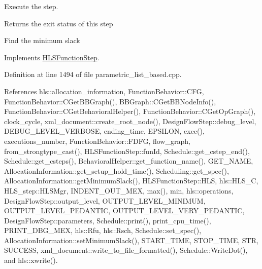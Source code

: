 Execute the step. 

\begin{DoxyReturn}{Returns}
the exit status of this step 
\end{DoxyReturn}
Find the minimum slack 

Implements \hyperlink{classHLSFunctionStep_a8db4c00d080655984d98143206fc9fa8}{H\+L\+S\+Function\+Step}.



Definition at line 1494 of file parametric\+\_\+list\+\_\+based.\+cpp.



References hls\+::allocation\+\_\+information, Function\+Behavior\+::\+C\+FG, Function\+Behavior\+::\+C\+Get\+B\+B\+Graph(), B\+B\+Graph\+::\+C\+Get\+B\+B\+Node\+Info(), Function\+Behavior\+::\+C\+Get\+Behavioral\+Helper(), Function\+Behavior\+::\+C\+Get\+Op\+Graph(), clock\+\_\+cycle, xml\+\_\+document\+::create\+\_\+root\+\_\+node(), Design\+Flow\+Step\+::debug\+\_\+level, D\+E\+B\+U\+G\+\_\+\+L\+E\+V\+E\+L\+\_\+\+V\+E\+R\+B\+O\+SE, ending\+\_\+time, E\+P\+S\+I\+L\+ON, exec(), executions\+\_\+number, Function\+Behavior\+::\+F\+D\+FG, flow\+\_\+graph, from\+\_\+strongtype\+\_\+cast(), H\+L\+S\+Function\+Step\+::fun\+Id, Schedule\+::get\+\_\+cstep\+\_\+end(), Schedule\+::get\+\_\+csteps(), Behavioral\+Helper\+::get\+\_\+function\+\_\+name(), G\+E\+T\+\_\+\+N\+A\+ME, Allocation\+Information\+::get\+\_\+setup\+\_\+hold\+\_\+time(), Scheduling\+::get\+\_\+spec(), Allocation\+Information\+::get\+Minimum\+Slack(), H\+L\+S\+Function\+Step\+::\+H\+LS, hls\+::\+H\+L\+S\+\_\+C, H\+L\+S\+\_\+step\+::\+H\+L\+S\+Mgr, I\+N\+D\+E\+N\+T\+\_\+\+O\+U\+T\+\_\+\+M\+EX, max(), min, hls\+::operations, Design\+Flow\+Step\+::output\+\_\+level, O\+U\+T\+P\+U\+T\+\_\+\+L\+E\+V\+E\+L\+\_\+\+M\+I\+N\+I\+M\+UM, O\+U\+T\+P\+U\+T\+\_\+\+L\+E\+V\+E\+L\+\_\+\+P\+E\+D\+A\+N\+T\+IC, O\+U\+T\+P\+U\+T\+\_\+\+L\+E\+V\+E\+L\+\_\+\+V\+E\+R\+Y\+\_\+\+P\+E\+D\+A\+N\+T\+IC, Design\+Flow\+Step\+::parameters, Schedule\+::print(), print\+\_\+cpu\+\_\+time(), P\+R\+I\+N\+T\+\_\+\+D\+B\+G\+\_\+\+M\+EX, hls\+::\+Rfu, hls\+::\+Rsch, Schedule\+::set\+\_\+spec(), Allocation\+Information\+::set\+Minimum\+Slack(), S\+T\+A\+R\+T\+\_\+\+T\+I\+ME, S\+T\+O\+P\+\_\+\+T\+I\+ME, S\+TR, S\+U\+C\+C\+E\+SS, xml\+\_\+document\+::write\+\_\+to\+\_\+file\+\_\+formatted(), Schedule\+::\+Write\+Dot(), and hls\+::xwrite().

